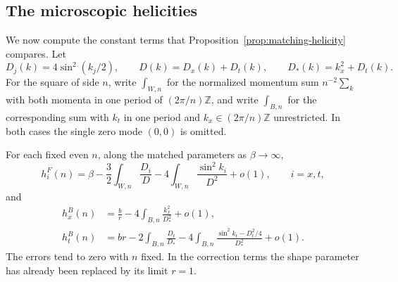 \subsection{The microscopic helicities}

We now compute the constant terms that Proposition~\ref{prop:matching-helicity}
compares. Let
\[
 D_j(k)=4\sin^2(k_j/2),\qquad
 D(k)=D_x(k)+D_t(k),\qquad D_*(k)=k_x^2+D_t(k).
\]
For the square of side $n$, write $\int_{W,n}$ for the normalized
momentum sum $n^{-2}\sum_k$ with both momenta in one period of
$(2\pi/n)\mathbb Z$, and write $\int_{B,n}$ for the corresponding sum
with $k_t$ in one period and $k_x\in(2\pi/n)\mathbb Z$ unrestricted.
In both cases the single zero mode $(0,0)$ is omitted.

\begin{lemma}
\label{lem:matching-microscopic-helicity}
For each fixed even $n$, along the matched parameters as
$\beta\to\infty$,
\begin{equation}
 h_i^F(n)=\beta-\frac32\int_{W,n}\frac{D_i}{D}
                -4\int_{W,n}\frac{\sin^2 k_i}{D^2}+o(1),
 \qquad i=x,t,
 \label{eq:R19}
\end{equation}
and
\begin{equation}
 \begin{aligned}
 h_x^B(n)&=\frac br-4\int_{B,n}\frac{k_x^2}{D_*^2}+o(1),\\
 h_t^B(n)&=br-2\int_{B,n}\frac{D_t}{D_*}
       -4\int_{B,n}\frac{\sin^2 k_t-D_t^2/4}{D_*^2}+o(1).
 \end{aligned}
 \label{eq:R20}
\end{equation}
The errors tend to zero with $n$ fixed. In the correction terms the shape
parameter has already been replaced by its limit $r=1$.
\end{lemma}

